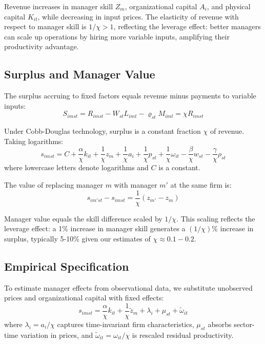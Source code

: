 \documentclass[11pt,a4paper]{article}
\begin{document}
Revenue increases in manager skill $Z_m$, organizational capital $A_i$, and physical capital $K_{it}$, while decreasing in input prices. The elasticity of revenue with respect to manager skill is $1/\chi > 1$, reflecting the leverage effect: better managers can scale up operations by hiring more variable inputs, amplifying their productivity advantage.

\subsection{Surplus and Manager Value}

The surplus accruing to fixed factors equals revenue minus payments to variable inputs:
\begin{equation}\label{eq:surplus}
S_{imst} = R_{imst} - W_{st}L_{imt} - \varrho_{st}M_{imt} = \chi R_{imst}
\end{equation}

Under Cobb-Douglas technology, surplus is a constant fraction $\chi$ of revenue. Taking logarithms:
\begin{equation}\label{eq:log_surplus}
s_{imst} = C+\frac{\alpha}{\chi} k_{it} + \frac{1}{\chi} z_{m} + \frac{1}{\chi} a_i + \frac{1}{\chi} p_{st} + \frac{1}{\chi}\omega_{it} 
- \frac{\beta}{\chi} w_{st} - \frac{\gamma}{\chi} \rho_{st}
\end{equation}
where lowercase letters denote logarithms and $C$ is a constant.

The value of replacing manager $m$ with manager $m'$ at the same firm is:
\begin{equation}\label{eq:manager_value}
s_{im'st} - s_{imst} = \frac{1}{\chi}(z_{m'} - z_{m})
\end{equation}

Manager value equals the skill difference scaled by $1/\chi$. This scaling reflects the leverage effect: a 1\% increase in manager skill generates a $(1/\chi)\%$ increase in surplus, typically 5-10\% given our estimates of $\chi \approx 0.1-0.2$.

\subsection{Empirical Specification}

To estimate manager effects from observational data, we substitute unobserved prices and organizational capital with fixed effects:
\begin{equation}\label{eq:empirical}
s_{imst} = \frac{\alpha}{\chi} k_{it} + \frac{1}{\chi}\tilde{z}_m + \lambda_i + \mu_{st} + \tilde{\omega}_{it}
\end{equation}
where $\lambda_i = a_i/\chi$ captures time-invariant firm characteristics, $\mu_{st}$ absorbs sector-time variation in prices, and $\tilde{\omega}_{it} = \omega_{it}/\chi$ is rescaled residual productivity.
\end{document}
